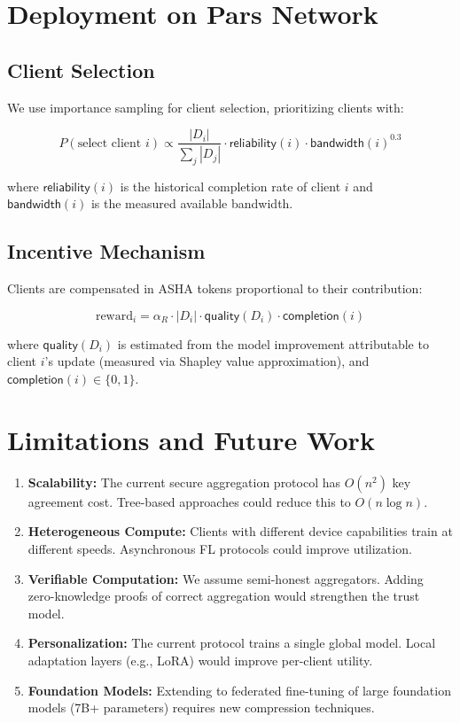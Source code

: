 \documentclass[11pt,a4paper]{article}
\begin{document}
\section{Deployment on Pars Network}

\subsection{Client Selection}

We use importance sampling for client selection, prioritizing clients with:

\begin{equation}
    P(\text{select client } i) \propto \frac{|D_i|}{\sum_j |D_j|} \cdot \mathsf{reliability}(i) \cdot \mathsf{bandwidth}(i)^{0.3}
\end{equation}

where $\mathsf{reliability}(i)$ is the historical completion rate of client $i$ and $\mathsf{bandwidth}(i)$ is the measured available bandwidth.

\subsection{Incentive Mechanism}

Clients are compensated in ASHA tokens proportional to their contribution:

\begin{equation}
    \text{reward}_i = \alpha_R \cdot |D_i| \cdot \mathsf{quality}(D_i) \cdot \mathsf{completion}(i)
\end{equation}

where $\mathsf{quality}(D_i)$ is estimated from the model improvement attributable to client $i$'s update (measured via Shapley value approximation), and $\mathsf{completion}(i) \in \{0, 1\}$.

\section{Limitations and Future Work}

\begin{enumerate}
    \item \textbf{Scalability:} The current secure aggregation protocol has $O(n^2)$ key agreement cost. Tree-based approaches could reduce this to $O(n \log n)$.
    \item \textbf{Heterogeneous Compute:} Clients with different device capabilities train at different speeds. Asynchronous FL protocols could improve utilization.
    \item \textbf{Verifiable Computation:} We assume semi-honest aggregators. Adding zero-knowledge proofs of correct aggregation would strengthen the trust model.
    \item \textbf{Personalization:} The current protocol trains a single global model. Local adaptation layers (e.g., LoRA) would improve per-client utility.
    \item \textbf{Foundation Models:} Extending to federated fine-tuning of large foundation models (7B+ parameters) requires new compression techniques.
\end{enumerate}
\end{document}

